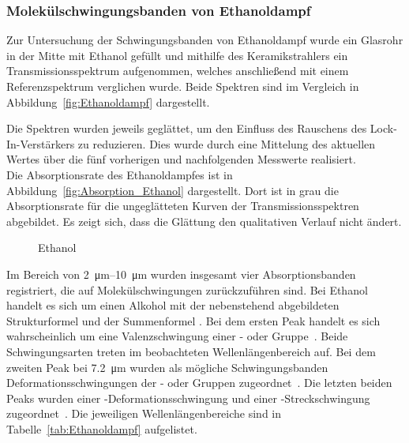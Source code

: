 \documentclass[a4paper,twoside,final]{article}
\begin{document}


\subsubsection{Molekülschwingungsbanden von Ethanoldampf}
Zur Untersuchung der Schwingungsbanden von Ethanoldampf wurde ein Glasrohr in der Mitte mit Ethanol gefüllt und mithilfe des Keramikstrahlers ein Transmissionsspektrum aufgenommen, welches anschließend mit einem Referenzspektrum verglichen wurde. Beide Spektren sind im Vergleich in Abbildung~\ref{fig:Ethanoldampf} dargestellt.



Die Spektren wurden jeweils geglättet, um den Einfluss des Rauschens des Lock-In-Verstärkers zu reduzieren. Dies wurde durch eine Mittelung des aktuellen Wertes über die fünf vorherigen und nachfolgenden Messwerte realisiert.\\
Die Absorptionsrate des Ethanoldampfes ist in Abbildung~\ref{fig:Absorption_Ethanol} dargestellt. Dort ist in grau die Absorptionsrate für die ungeglätteten Kurven der Transmissionsspektren abgebildet. Es zeigt sich, dass die Glättung den qualitativen Verlauf nicht ändert.



\begin{figure}
  \centering
  \caption{Ethanol}
\end{figure}
Im Bereich von \SIrange{2}{10}{\micro\metre} wurden insgesamt vier Absorptionsbanden registriert, die auf Molekülschwingungen zurückzuführen sind. Bei Ethanol handelt es sich um einen Alkohol mit der nebenstehend abgebildeten Strukturformel und der Summenformel . Bei dem ersten Peak handelt es sich wahrscheinlich um eine Valenzschwingung einer - oder  Gruppe~\cite{Roempp}. Beide Schwingungsarten treten im beobachteten Wellenlängenbereich auf. Bei dem zweiten Peak bei \SI{7.2}{\micro\metre} wurden als mögliche Schwingungsbanden Deformationsschwingungen der - oder  Gruppen zugeordnet~\cite{Roempp}. Die letzten beiden Peaks wurden einer -Deformationsschwingung und einer -Streckschwingung zugeordnet~\cite{Gunzler}. Die jeweiligen Wellenlängenbereiche sind in Tabelle~\ref{tab:Ethanoldampf} aufgelistet.
\end{document}
